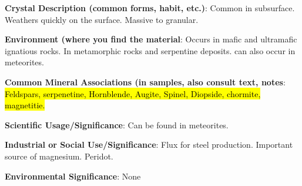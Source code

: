 \documentclass[10pt]{article}
\begin{document}
\begin{framed}
  \textbf{Crystal Description (common forms, habit, etc.)}: Common in subsurface. Weathers quickly on the surface. Massive to granular. 
\end{framed}

\begin{framed}
  \textbf{Environment (where you find the material}: Occurs in mafic and ultramafic ignatious rocks. In metamorphic rocks and serpentine deposits. can also occur in meteorites.
\end{framed}

\begin{framed}
  \textbf{Common Mineral Associations (in samples, also consult text, notes}: \hl{Feldspars, serpenetine, Hornblende, Augite, Spinel, Diopside, chormite, magnetitie.}
\end{framed}

\begin{framed}
  \textbf{Scientific Usage/Significance}: Can be found in meteorites.
\end{framed}


\begin{framed}
  \textbf{Industrial or Social Use/Significance}: Flux for steel production. Important source of magnesium. Peridot.
\end{framed}

\begin{framed}
  \textbf{Environmental Significance}: None
\end{framed}

\end{document}
